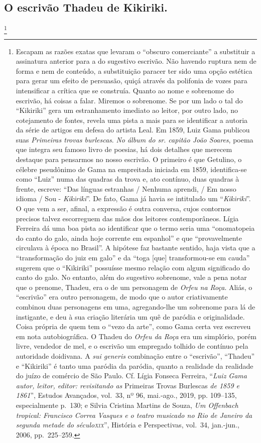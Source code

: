 \subsection{O escrivão Thadeu de Kikiriki.}\footnote{ Escapam as razões exatas que
  levaram o ``obscuro comerciante'' a substituir a assinatura anterior
  para a do sugestivo escrivão. Não havendo ruptura nem de forma e nem
  de conteúdo, a substituição paracer ter sido uma opção estética para
  gerar um efeito de persuasão, quiçá através da polifonia de vozes para
  intensificar a crítica que se construía. Quanto ao nome e sobrenome do
  escrivão, há coisas a falar. Miremos o sobrenome. Se por um lado o tal
  do ``Kikiriki'' gera um estranhamento imediato ao leitor, por outro
  lado, no cotejamento de fontes, revela uma pista a mais para se
  identificar a autoria da série de artigos em defesa do artista Leal.
  Em 1859, Luiz Gama publicou suas \emph{Primeiras trovas burlescas}.
  \emph{No álbum do sr. capitão João Soares}, poema que integra seu
  famoso livro de poesias, há dois detalhes que merecem destaque para
  pensarmos no nosso escrivão. O primeiro é que Getulino, o célebre
  pseudônimo de Gama na empreitada iniciada em 1859, identifica-se como
  ``Luiz'' numa das quadras da trova e, ato contínuo, duas quadras à
  frente, escreve: ``Das línguas estranhas / Nenhuma aprendi, / Em nosso
  idioma / Sou - \emph{Kikiriki}''. De fato, Gama já havia se intitulado
  um ``\emph{Kikiriki}''. O que vem a ser, afinal, a expressão é outra
  conversa, cujos contornos precisos talvez escorreguem das mãos dos
  leitores contemporâneos. Lígia Ferreira dá uma boa pista ao
  identificar que o termo seria uma ``onomatopeia do canto do galo, ainda
  hoje corrente em espanhol'' e que ``provavelmente circulava à época no
  Brasil''. A hipótese faz bastante sentido, haja vista que a
  ``transformação do juiz em galo'' e da ``toga {[}que{]} transformou-se em
  cauda'' sugerem que o ``Kikiriki'' possuísse mesmo relação com algum
  significado do canto do galo. No entanto, além do sugestivo sobrenome,
  vale a pena notar que o prenome, Thadeu, era o de um personagem de
  \emph{Orfeu na Roça}. Aliás, o ``escrivão'' era outro personagem, de
  modo que o autor criativamente combinou duas personagens em uma,
  agregando-lhe um sobrenome para lá de instigante, e deu à sua criação
  literária um quê de paródia e originalidade. Coisa própria de quem tem
  o ``vezo da arte'', como Gama certa vez escreveu em nota autobiográfica.
  O Thadeu do \emph{Orfeu da Roça} era um simplório, porém livre,
  vendedor de mel, e o escrivão um empregado tolhido de contínuo pela
  autoridade doidivana. A \emph{sui generis} combinação entre o
  ``escrivão'', ``Thadeu'' e ``Kikiriki'' é tanto uma paródia da paródia,
  quanto a realidade da realidade do juízo de comércio de São Paulo. Cf.
  Lígia Fonseca Ferreira, ``\emph{Luiz Gama autor, leitor, editor:
  revisitando as} Primeiras Trovas Burlescas \emph{de 1859 e 1861}'',
  Estudos Avançados, vol.~33, nº 96, mai.-ago., 2019, pp. 109--135,
  especialmente p.~130; e Silvia Cristina Martins de Souza, \emph{Um
  Offenbach tropical: Francisco Correa Vasques e o teatro musicado no
  Rio de Janeiro da segunda metade do século\textsc{xix}}'', História e
  Perspectivas, vol.~34, jan.-jun., 2006, pp.~225--259.}

